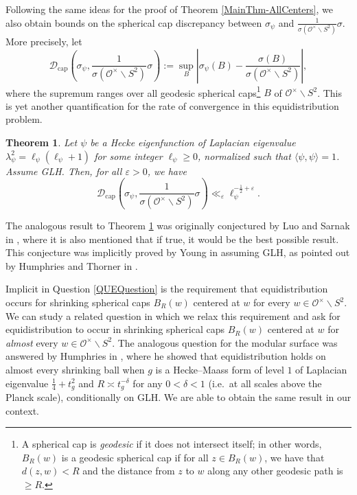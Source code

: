 \documentclass[11pt]{amsart}
\newtheorem{theorem}{Theorem}[section]
\theoremstyle{definition}
\begin{document}
Following the same ideas for the proof of Theorem \ref{MainThm-AllCenters}, we also obtain bounds on the spherical cap discrepancy between $\sigma_{\psi}$ and $\frac{1}{\sigma(\mathcal{O}^{\times} \backslash S^2)} \sigma$. More precisely, let $$ \mathcal{D}_{\mathrm{cap}}\left(\sigma_{\psi},\frac{1}{\sigma(\mathcal{O}^{\times} \backslash S^2)} \sigma \right) := \sup_{B} \left|\sigma_{\psi}(B) - \frac{\sigma(B)}{\sigma(\mathcal{O}^{\times} \backslash S^2)}\right|,$$ where the supremum ranges over all geodesic spherical caps\footnote{A spherical cap is \textit{geodesic} if it does not intersect itself; in other words, $B_{R}(w)$ is a geodesic spherical cap if for all $z\in B_{R}(w)$, we have that $d(z,w)<R$ and the distance from $z$ to $w$ along any other geodesic path is $\geq R$.} $B$ of $\mathcal{O}^{\times} \backslash S^2$. This is yet another quantification for the rate of convergence in this equidistribution problem.

\begin{theorem}\label{MainThm-SphCapDisc}
Let $\psi$ be a Hecke eigenfunction of Laplacian eigenvalue $\lambda_{\psi}^2 = \ell_{\psi}(\ell_{\psi}+1)$ for some integer $\ell_{\psi} \geq 0$, normalized such that $\langle \psi, \psi \rangle = 1$. Assume GLH. Then, for all $\varepsilon>0$, we have $$ \mathcal{D}_{\mathrm{cap}}\left( \sigma_{\psi}, \frac{1}{\sigma(\mathcal{O}^{\times} \backslash S^2)} \sigma \right) \ll_{\varepsilon} \ell_{\psi}^{-\frac{1}{2} + \varepsilon}. $$
\end{theorem}

The analogous result to Theorem \ref{MainThm-SphCapDisc} was originally conjectured by Luo and Sarnak in \cite[p.~210]{LuoSarnakQUE}, where it is also mentioned that if true, it would be the best possible result. This conjecture was implicitly proved by Young in \cite{YoungQUEShrinking} assuming GLH, as pointed out by Humphries and Thorner in \cite[p.~2]{HumphriesThorner}.

Implicit in Question \ref{QUEQuestion} is the requirement that equidistribution occurs for shrinking spherical caps $B_R(w)$ centered at $w$ for every $w\in \mathcal{O}^{\times} \backslash S^2$. We can study a related question in which we relax this requirement and ask for equidistribution to occur in shrinking spherical caps $B_R(w)$ centered at $w$ for \textit{almost} every $w\in \mathcal{O}^{\times} \backslash S^2$. The analogous question for the modular surface was answered by Humphries in \cite[Thm.~1.17]{HumphriesPhD}, where he showed that equidistribution holds on almost every shrinking ball when $g$ is a Hecke--Maass form of level $1$ of Laplacian eigenvalue $\frac{1}{4} + t_{g}^2$ and $R\asymp t_{g}^{-\delta}$ for any $0<\delta <1$ (i.e.~at all scales above the Planck scale), conditionally on GLH. We are able to obtain the same result in our context.
\end{document}
